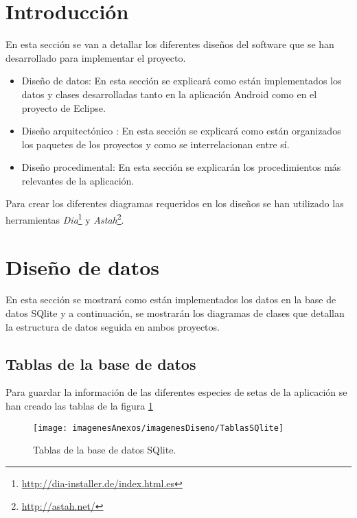 
\section{Introducción}

En esta sección se van a detallar los diferentes diseños del software que se han desarrollado para implementar el proyecto.

\begin{itemize}
	\item Diseño de datos: En esta sección se explicará como están implementados los datos y clases desarrolladas tanto en la aplicación Android como en el proyecto de Eclipse.
	\item Diseño arquitectónico : En esta sección se explicará como están organizados los paquetes de los proyectos y como se interrelacionan entre sí.
	\item Diseño procedimental: En esta sección se explicarán los procedimientos más relevantes de la aplicación.
\end{itemize}

Para crear los diferentes diagramas requeridos en los diseños se han utilizado las herramientas \textit{Dia}\footnote{\url{http://dia-installer.de/index.html.es}} y \textit{Astah}\footnote{\url{http://astah.net/}}.

\section{Diseño de datos}

En esta sección se mostrará como están implementados los datos en la base de datos SQlite y a continuación, se mostrarán los diagramas de clases que detallan la estructura de datos seguida en ambos proyectos.

\subsection{Tablas de la base de datos}

Para guardar la información de las diferentes especies de setas de la aplicación se han creado las tablas de la figura \ref{figTablasSQlite}

\begin{figure}[h]
    \begin{center}%
        \begin{center}%
          \texttt{[image: imagenesAnexos/imagenesDiseno/TablasSQlite]}%
          \caption{Tablas de la base de datos SQlite.}%
          \label{figTablasSQlite}%
        \end{center}%
  	\end{center}%
\end{figure}%

